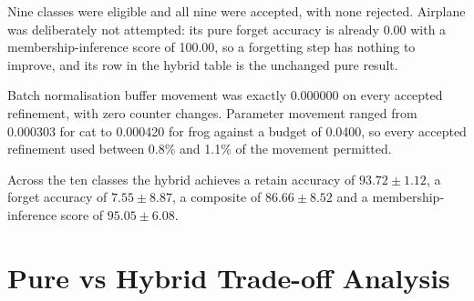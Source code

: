 \begin{table}[htbp]
  \centering
  \caption{Refinement acceptance record. Nine attempts, nine accepted, zero
  rejected. Airplane was not attempted because its pure forget accuracy is already
  0.00.}
  \label{tab:refinement-acceptance}
\end{table}

Nine classes were eligible and all nine were accepted, with none rejected.
Airplane was deliberately not attempted: its pure forget accuracy is already 0.00
with a membership-inference score of 100.00, so a forgetting step has nothing to
improve, and its row in the hybrid table is the unchanged pure result.

Batch normalisation buffer movement was exactly 0.000000 on every accepted
refinement, with zero counter changes. Parameter movement ranged from 0.000303 for
cat to 0.000420 for frog against a budget of 0.0400, so every accepted refinement
used between 0.8\% and 1.1\% of the movement permitted.

\begin{table}[htbp]
  \centering
  \caption{Hybrid MED-US across all ten classes. Each refined row is the pure
  $C^{*}$ followed by one gradient-ascent step on $D_f$ and one repair step on
  $D_r$, with batch normalisation frozen. Airplane is an unmodified pure result.}
  \label{tab:hybrid-ten-class}
\end{table}

Across the ten classes the hybrid achieves a retain accuracy of
$93.72 \pm 1.12$, a forget accuracy of $7.55 \pm 8.87$, a composite of
$86.66 \pm 8.52$ and a membership-inference score of $95.05 \pm 6.08$.

\section{Pure vs Hybrid Trade-off Analysis}
\label{sec:exp-tradeoff}

